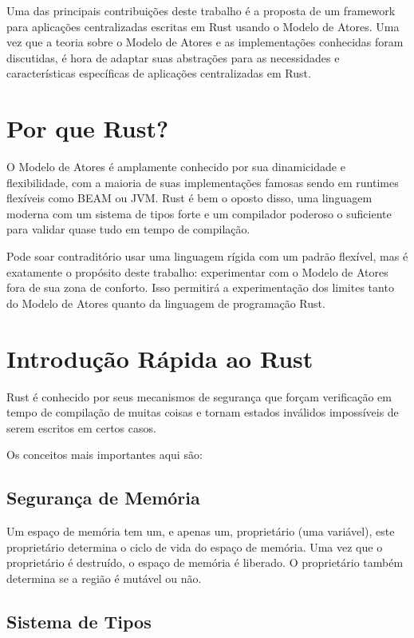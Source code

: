 Uma das principais contribuições deste trabalho é a proposta de um framework para aplicações centralizadas escritas em Rust usando o Modelo de Atores. Uma vez que a teoria sobre o Modelo de Atores e as implementações conhecidas foram discutidas, é hora de adaptar suas abstrações para as necessidades e características específicas de aplicações centralizadas em Rust.

\section{Por que Rust?}

O Modelo de Atores é amplamente conhecido por sua dinamicidade e flexibilidade, com a maioria de suas implementações famosas sendo em runtimes flexíveis como BEAM ou JVM. Rust é bem o oposto disso, uma linguagem moderna com um sistema de tipos forte e um compilador poderoso o suficiente para validar quase tudo em tempo de compilação.

Pode soar contraditório usar uma linguagem rígida com um padrão flexível, mas é exatamente o propósito deste trabalho: experimentar com o Modelo de Atores fora de sua zona de conforto. Isso permitirá a experimentação dos limites tanto do Modelo de Atores quanto da linguagem de programação Rust.

\section{Introdução Rápida ao Rust}

Rust é conhecido por seus mecanismos de segurança que forçam verificação em tempo de compilação de muitas coisas e tornam estados inválidos impossíveis de serem escritos em certos casos.

Os conceitos mais importantes aqui são:

\subsection{Segurança de Memória}

Um espaço de memória tem um, e apenas um, proprietário (uma variável), este proprietário determina o ciclo de vida do espaço de memória. Uma vez que o proprietário é destruído, o espaço de memória é liberado. O proprietário também determina se a região é mutável ou não.

\subsection{Sistema de Tipos}

